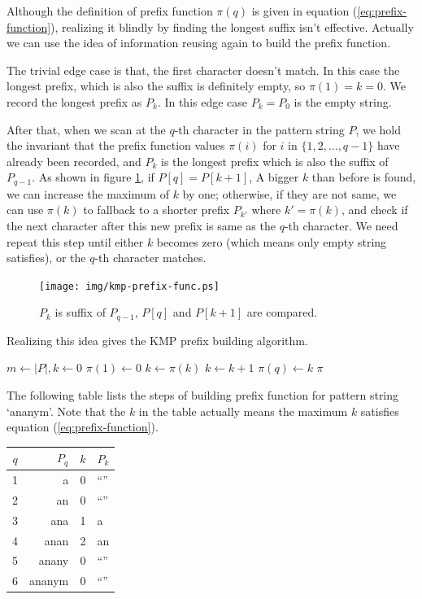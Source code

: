 \documentclass[UTF8]{article}
\begin{document}
Although the definition of prefix function $\pi(q)$ is given in equation (\ref{eq:prefix-function}), realizing it
blindly by finding the longest suffix isn't effective. Actually we can use the idea of information reusing again
to build the prefix function.

The trivial edge case is that, the first character doesn't match. In this case the longest prefix, which is
also the suffix is definitely empty, so $\pi(1) = k = 0$. We record the longest prefix as $P_k$.
In this edge case $P_k = P_0$ is the empty string.

After that, when we scan at the $q$-th character in the pattern string $P$, we hold the invariant that the
prefix function values $\pi(i)$ for $i$ in $\{1, 2, ..., q-1 \}$ have already been recorded, and $P_k$ is
the longest prefix which is also the suffix of $P_{q-1}$. As shown in figure \ref{fig:kmp-prefix-func},
if $P[q] = P[k+1]$, A bigger $k$ than before is found, we can increase the maximum of $k$ by one;
otherwise, if they are not same, we can use $\pi(k)$ to fallback to a shorter prefix $P_{k'}$ where
$k' = \pi(k)$, and check if the next character after this new prefix is same as the $q$-th character.
We need repeat this step until either $k$ becomes zero (which means only empty string satisfies),
or the $q$-th character matches.

\begin{figure}[htbp]
 \centering
 \texttt{[image: img/kmp-prefix-func.ps]}
 \caption{$P_k$ is suffix of $P_{q-1}$, $P[q]$ and $P[k+1]$ are compared.}
 \label{fig:kmp-prefix-func}
\end{figure}

Realizing this idea gives the KMP prefix building algorithm.

\begin{algorithmic}[1]
  \State $m \gets |P|, k \gets 0$
  \State $\pi(1) \gets 0$
      \State $k \gets \pi(k)$
    \EndWhile
      \State $k \gets k + 1$
    \EndIf
    \State $\pi(q) \gets k$
  \EndFor
  \State \Return $\pi$
\EndFunction
\end{algorithmic}

The following table lists the steps of building prefix function for pattern string `ananym'. Note that
the $k$ in the table actually means the maximum $k$ satisfies equation (\ref{eq:prefix-function}).

\begin{tabular}{|c|r|c|l|}
\hline
$q$ & $P_q$ & $k$ & $P_k$ \\
\hline
1 & a & 0 & ``'' \\
2 & an & 0 & ``'' \\
3 & ana & 1 & a \\
4 & anan & 2 & an  \\
5 & anany & 0 & ``'' \\
6 & ananym & 0 & ``'' \\
\hline
\end{tabular}
\end{document}
